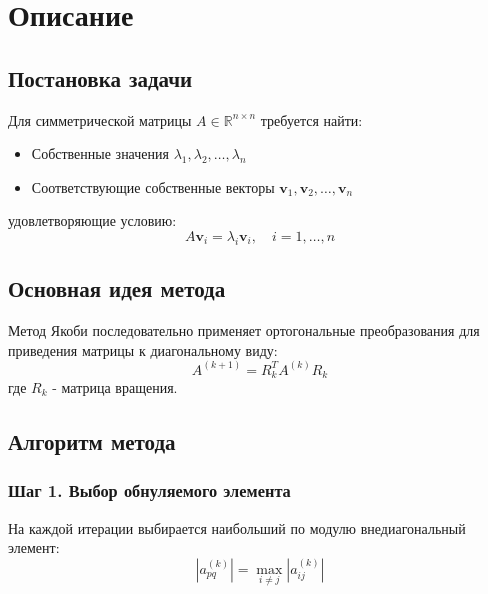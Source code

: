 
\section*{Описание}

\subsection*{Постановка задачи}
Для симметрической матрицы $A \in \mathbb{R}^{n \times n}$ требуется найти:
\begin{itemize}
\item Собственные значения $\lambda_1, \lambda_2, \ldots, \lambda_n$
\item Соответствующие собственные векторы $\mathbf{v}_1, \mathbf{v}_2, \ldots, \mathbf{v}_n$
\end{itemize}
удовлетворяющие условию:
\begin{equation}
A\mathbf{v}_i = \lambda_i\mathbf{v}_i, \quad i=1,\ldots,n
\end{equation}

\subsection*{Основная идея метода}
Метод Якоби последовательно применяет ортогональные преобразования для приведения матрицы к диагональному виду:
\begin{equation}
A^{(k+1)} = R_k^T A^{(k)} R_k
\end{equation}
где $R_k$ - матрица вращения.

\subsection*{Алгоритм метода}

\subsubsection*{Шаг 1. Выбор обнуляемого элемента}
На каждой итерации выбирается наибольший по модулю внедиагональный элемент:
\begin{equation}
|a_{pq}^{(k)}| = \max_{i \neq j} |a_{ij}^{(k)}|
\end{equation}

